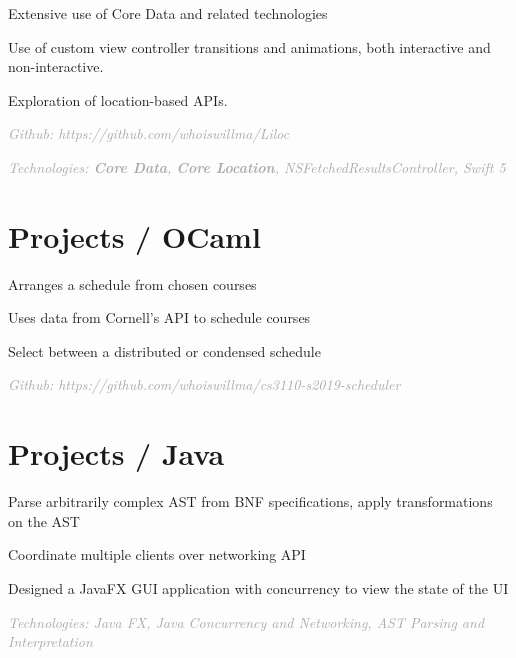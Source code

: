 \documentclass[]{deedy-resume-openfont}
\let\sectionold\section
\renewcommand{\section}[1]{
	\sectionold{\textcolor{sectiontitlecolor}{#1}}
}
\begin{document}
\begin{minipage}[t]{0.66\textwidth}
\begin{tightemize}
\item Extensive use of Core Data and related technologies
\item Use of custom view controller transitions and animations, both interactive and non-interactive.
\item Exploration of location-based APIs.
\\
\item \textcolor{darkgray}{\textit{Github: https://github.com/whoiswillma/Liloc}}
\item \textcolor{darkgray}{\textit{Technologies: \textbf{Core Data}, \textbf{Core Location}, NSFetchedResultsController, Swift 5 }}
\end{tightemize} 
\sectionsep


\section{Projects / OCaml}

\begin{tightemize}
\item Arranges a schedule from chosen courses
\item Uses data from Cornell's API to schedule courses
\item Select between a distributed or condensed schedule
\\
\item \textcolor{darkgray}{\textit{Github: https://github.com/whoiswillma/cs3110-s2019-scheduler}}
\end{tightemize}
\sectionsep

\section{Projects / Java}

\begin{tightemize}
\item Parse arbitrarily complex AST from BNF specifications, apply transformations on the AST
\item Coordinate multiple clients over networking API
\item Designed a JavaFX GUI application with concurrency to view the state of the UI
\\
\item \textcolor{darkgray}{\textit{Technologies: Java FX, Java Concurrency and Networking, AST Parsing and Interpretation}}
\end{tightemize}
\sectionsep

\end{minipage} 
\end{document}
